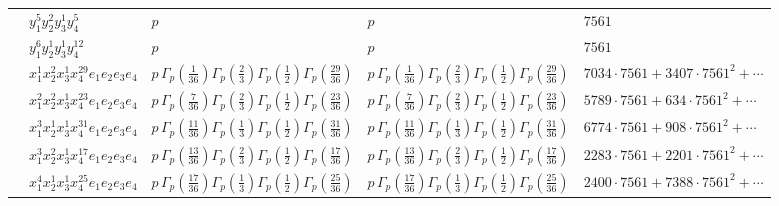 \documentclass[11pt]{article}
\begin{document}
\begin{table}[ht]
{\begin{tabular}{@{}lllll@{}}
 & $y_{1}^{5} y_{2}^{2} y_{3}^{1} y_{4}^{5}$ & $p \,$ & $p \,$ & $7561$ \\
 & $y_{1}^{6} y_{2}^{1} y_{3}^{1} y_{4}^{12}$ & $p \,$ & $p \,$ & $7561$ \\
 & $x_{1}^{1} x_{2}^{2} x_{3}^{1} x_{4}^{29}  e_{1} e_{2} e_{3} e_{4}$ & $p \, \Gamma_p \left( \frac{1}{36} \right) \Gamma_p \left( \frac{2}{3} \right) \Gamma_p \left( \frac{1}{2} \right) \Gamma_p \left( \frac{29}{36} \right)$ & $p \, \Gamma_p \left( \frac{1}{36} \right) \Gamma_p \left( \frac{2}{3} \right) \Gamma_p \left( \frac{1}{2} \right) \Gamma_p \left( \frac{29}{36} \right)$ & $7034{\cdot}7561{+}3407{\cdot}7561^{2}{+}\cdots$ \\
 & $x_{1}^{2} x_{2}^{2} x_{3}^{1} x_{4}^{23}  e_{1} e_{2} e_{3} e_{4}$ & $p \, \Gamma_p \left( \frac{7}{36} \right) \Gamma_p \left( \frac{2}{3} \right) \Gamma_p \left( \frac{1}{2} \right) \Gamma_p \left( \frac{23}{36} \right)$ & $p \, \Gamma_p \left( \frac{7}{36} \right) \Gamma_p \left( \frac{2}{3} \right) \Gamma_p \left( \frac{1}{2} \right) \Gamma_p \left( \frac{23}{36} \right)$ & $5789{\cdot}7561{+}634{\cdot}7561^{2}{+}\cdots$ \\
 & $x_{1}^{3} x_{2}^{1} x_{3}^{1} x_{4}^{31}  e_{1} e_{2} e_{3} e_{4}$ & $p \, \Gamma_p \left( \frac{11}{36} \right) \Gamma_p \left( \frac{1}{3} \right) \Gamma_p \left( \frac{1}{2} \right) \Gamma_p \left( \frac{31}{36} \right)$ & $p \, \Gamma_p \left( \frac{11}{36} \right) \Gamma_p \left( \frac{1}{3} \right) \Gamma_p \left( \frac{1}{2} \right) \Gamma_p \left( \frac{31}{36} \right)$ & $6774{\cdot}7561{+}908{\cdot}7561^{2}{+}\cdots$ \\
 & $x_{1}^{3} x_{2}^{2} x_{3}^{1} x_{4}^{17}  e_{1} e_{2} e_{3} e_{4}$ & $p \, \Gamma_p \left( \frac{13}{36} \right) \Gamma_p \left( \frac{2}{3} \right) \Gamma_p \left( \frac{1}{2} \right) \Gamma_p \left( \frac{17}{36} \right)$ & $p \, \Gamma_p \left( \frac{13}{36} \right) \Gamma_p \left( \frac{2}{3} \right) \Gamma_p \left( \frac{1}{2} \right) \Gamma_p \left( \frac{17}{36} \right)$ & $2283{\cdot}7561{+}2201{\cdot}7561^{2}{+}\cdots$ \\
 & $x_{1}^{4} x_{2}^{1} x_{3}^{1} x_{4}^{25}  e_{1} e_{2} e_{3} e_{4}$ & $p \, \Gamma_p \left( \frac{17}{36} \right) \Gamma_p \left( \frac{1}{3} \right) \Gamma_p \left( \frac{1}{2} \right) \Gamma_p \left( \frac{25}{36} \right)$ & $p \, \Gamma_p \left( \frac{17}{36} \right) \Gamma_p \left( \frac{1}{3} \right) \Gamma_p \left( \frac{1}{2} \right) \Gamma_p \left( \frac{25}{36} \right)$ & $2400{\cdot}7561{+}7388{\cdot}7561^{2}{+}\cdots$ \\

\end{tabular}}
\end{table}
\end{document}
